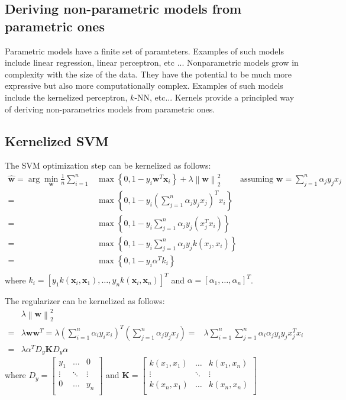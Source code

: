\documentclass[a4paper,10pt,twoside]{article}
\newcommand\norm[1]{\left\lVert#1\right\rVert}
\begin{document}
\subsection{Deriving non-parametric models from parametric ones}

Parametric models have a finite set of paramteters. Examples of such models include linear regression, linear perceptron, etc ...
Nonparametric models grow in complexity with the size of the data. They have the potential to be much more expressive but also more computationally complex. Examples of such models include the kernelized perceptron, $k$-NN, etc... Kernels provide a principled way of deriving non-parametrics models from parametric ones.

\subsection{Kernelized SVM}

The SVM optimization step can be kernelized as follows:
\begin{align*}
    \hat{\mathbf{w}}=\arg\min_{\mathbf{w}}\frac{1}{n}\sum_{i=1}^{n}&\max\left\{0,1-y_i\mathbf{w}^T\mathbf{x}_i\right\}+\lambda\norm{\mathbf{w}}_2^2 \qquad \text{ assuming } \mathbf{w}=\sum_{j=1}^{n}\alpha_jy_jx_j\\
    =&\max\left\{0,1-y_i(\sum_{j=1}^{n}\alpha_jy_jx_j)^Tx_i\right\}\\
    =&\max\left\{0,1-y_i\sum_{j=1}^{n}\alpha_jy_j(x_j^Tx_i)\right\}\\
    =&\max\left\{0,1-y_i\sum_{j=1}^{n}\alpha_jy_jk(x_j, x_i)\right\}\\
    =&\max\left\{0,1-y_i\alpha^Tk_i\right\}\\
\end{align*}
where $k_i=\left[y_1k(\mathbf{x}_i, \mathbf{x}_1), \ldots, y_nk(\mathbf{x}_i, \mathbf{x}_n)\right]^T$ and $\alpha = \left[\alpha_1, \ldots, \alpha_n\right]^T$.

The regularizer can be kernelized as follows:
\begin{align*}
    &\lambda\norm{\mathbf{w}}_2^2\\
    =&\lambda\mathbf{w}\mathbf{w}^T=\lambda(\sum_{i=1}^{n}\alpha_iy_ix_i)^T(\sum_{j=1}^{n}\alpha_jy_jx_j)
    =&\lambda\sum_{i=1}^{n}\sum_{j=1}^{n}\alpha_i\alpha_jy_iy_jx_j^Tx_i\\
    =&\lambda\alpha^T D_y\mathbf{K}D_y\alpha
\end{align*}
where $D_y=\begin{bmatrix}
    y_1 & \ldots & 0\\
    \vdots & \ddots & \vdots\\
    0 & \ldots & y_n\\
\end{bmatrix}$ and $\mathbf{K} = \begin{bmatrix}
    k(x_1,x_1) & \ldots & k(x_1,x_n)\\
    \vdots & \ddots & \vdots\\
    k(x_n,x_1) & \ldots & k(x_n,x_n)\\
\end{bmatrix}$
\end{document}
